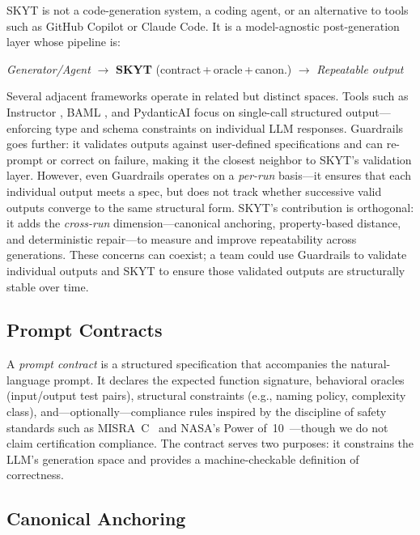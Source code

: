 \documentclass[sigconf]{acmart}
\begin{document}
SKYT is not a code-generation system, a coding agent, or an alternative to tools such as GitHub Copilot or Claude Code.  It is a model-agnostic post-generation layer whose pipeline is:

\smallskip
{\centering\small\emph{Generator/Agent} $\rightarrow$ \textbf{SKYT} (contract\,+\,oracle\,+\,canon.) $\rightarrow$ \emph{Repeatable output}\par}
\smallskip

Several adjacent frameworks operate in related but distinct spaces.  Tools such as Instructor \cite{instructor2024}, BAML \cite{baml2024}, and PydanticAI \cite{pydanticai2024} focus on single-call structured output---enforcing type and schema constraints on individual LLM responses.  Guardrails \cite{guardrails2023} goes further: it validates outputs against user-defined specifications and can re-prompt or correct on failure, making it the closest neighbor to SKYT's validation layer.  However, even Guardrails operates on a \emph{per-run} basis---it ensures that each individual output meets a spec, but does not track whether successive valid outputs converge to the same structural form.  SKYT's contribution is orthogonal: it adds the \emph{cross-run} dimension---canonical anchoring, property-based distance, and deterministic repair---to measure and improve repeatability across generations.  These concerns can coexist; a team could use Guardrails to validate individual outputs and SKYT to ensure those validated outputs are structurally stable over time.

\subsection{Prompt Contracts}
\label{sec:contracts}

A \emph{prompt contract} is a structured specification that accompanies the natural-language prompt.  It declares the expected function signature, behavioral oracles (input/output test pairs), structural constraints (e.g., naming policy, complexity class), and---optionally---compliance rules inspired by the discipline of safety standards such as MISRA~C~\cite{misra2012} and NASA's Power of~10~\cite{holzmann2006power}---though we do not claim certification compliance.  The contract serves two purposes: it constrains the LLM's generation space and provides a machine-checkable definition of correctness.

\subsection{Canonical Anchoring}
\label{sec:canon}
\end{document}
